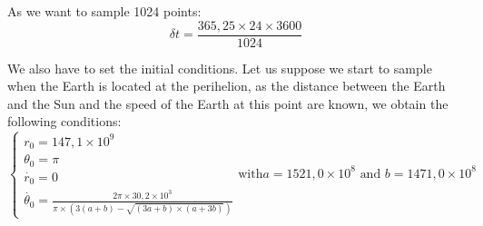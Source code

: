 As we want to sample 1024 points: \[\delta t = \frac{365,25 \times 24 \times 3600}{1024}\]

We also have to set the initial conditions. Let us suppose we start to sample when the Earth is located at the perihelion, as the distance between the Earth and the Sun and the speed of the Earth at this point are known, we obtain the following conditions:
\[
\begin{equation}
    \begin{cases}
    r_{0} = 147,1 \times 10^{9}\\
    \theta_{0} = \pi\\
    \dot{r_{0}} = 0\\
    \dot{\theta_{0}} = \frac{2\pi \times 30,2 \times 10^{3}}{\pi \times (3 (a + b) - \sqrt{(3a + b) \times (a + 3b)})}
    \end{cases}
\end{equation}

\text{with}
a = 1521,0 \times 10^{8}
\text{ and }
b = 1471,0 \times 10^{8}
\]